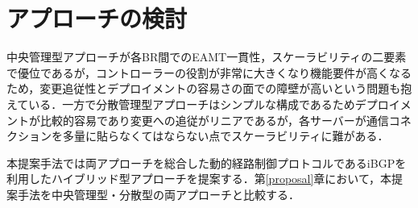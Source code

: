 \section{アプローチの検討}

中央管理型アプローチが各BR間でのEAMT一貫性，スケーラビリティの二要素で優位であるが，コントローラーの役割が非常に大きくなり機能要件が高くなるため，変更追従性とデプロイメントの容易さの面での障壁が高いという問題も抱えている．一方で分散管理型アプローチはシンプルな構成であるためデプロイメントが比較的容易であり変更への追従がリニアであるが，各サーバーが通信コネクションを多量に貼らなくてはならない点でスケーラビリティに難がある．

本提案手法では両アプローチを総合した動的経路制御プロトコルであるiBGPを利用したハイブリッド型アプローチを提案する．第\ref{proposal}章において，本提案手法を中央管理型・分散型の両アプローチと比較する．



